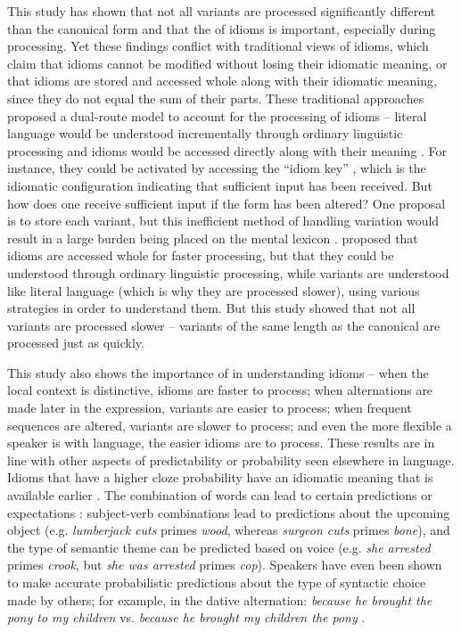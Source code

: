 \documentclass[output=paper,modfonts,nonflat]{langsci/langscibook}
\begin{document}
This study has shown that not all variants are processed significantly different than the canonical form and that the  of idioms is important, especially during processing. Yet these findings conflict with traditional views of idioms, which claim that idioms cannot be modified without losing their idiomatic meaning, or that idioms are stored and accessed whole along with their idiomatic meaning, since they do not equal the sum of their parts. These traditional approaches proposed a dual-route model to account for the processing of idioms -- literal language would be understood incrementally through ordinary linguistic processing and idioms would be accessed directly along with their meaning \citep[cf.][]{SwinneyCutler1979, CacciariTabossi1988}. For instance, they could be activated by accessing the ``idiom key'' \citep{CacciariTabossi1988}, which is the idiomatic configuration indicating that sufficient input has been received. But how does one receive sufficient input if the form has been altered? One proposal is to store each variant, but this inefficient method of handling variation would result in a large burden being placed on the mental lexicon \citep{BaayenEtAl2013}. \citet{McGloneEtAl1994} proposed that idioms are accessed whole for faster processing, but that they could be understood through ordinary linguistic processing, while variants are understood like literal language (which is why they are processed slower), using various strategies in order to understand them. But this study showed that not all variants are processed slower -- variants of the same length as the canonical are processed just as quickly.

This study also shows the importance of  in understanding idioms -- when the local context is distinctive, idioms are faster to process; when alternations are made later in the expression, variants are easier to process; when frequent sequences are altered, variants are slower to process; and even the more flexible a speaker is with language, the easier idioms are to process. These results are in line with other aspects of predictability or probability seen elsewhere in language. Idioms that have a higher cloze probability have an idiomatic meaning that is available earlier \citep{CacciariTabossi1988, TitoneConnine1994b}. The combination of words can lead to certain predictions or expectations \citep{Elman2011}: subject-verb combinations lead to predictions about the upcoming object (e.g. \textit{lumberjack cuts} primes \textit{wood}, whereas \textit{surgeon cuts} primes \textit{bone}), and the type of semantic theme can be predicted based on voice (e.g. \textit{she arrested} primes \textit{crook}, but \textit{she was arrested} primes \textit{cop}). Speakers have even been shown to make accurate probabilistic predictions about the type of syntactic choice made by others; for example, in the dative alternation: \textit{because he brought the pony to my children} vs. \textit{because he brought my children the pony} \citep{Bresnan2007}.
\end{document}
